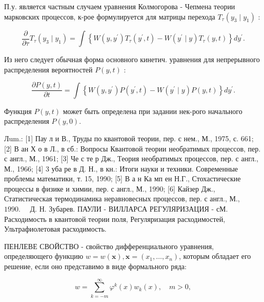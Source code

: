 \documentclass[10pt]{article}
\begin{document}
П.у. является частным случаем уравнения Колмогорова - Чепмена теории марковских процессов, к-рое формулируется для матрицы перехода $T_{\tau}\left(y_{3} \mid y_{1}\right)$ :



\[

\frac{\partial}{\partial \tau} T_{\tau}\left(y_{3} \mid y_{1}\right)=\int\left\{W\left(y, y^{\prime}\right) T_{\tau}\left(y^{\prime}, t\right)-W\left(y^{\prime} \mid y\right) T_{\tau}(y, t)\right\} d y^{\prime} .

\]



Из него следует обычная форма основного кинетич. уравнения для непрерывного распределения вероятностей $P(y, t)$ :



\[

\frac{\partial P(y, t)}{\partial t}=\int\left\{W\left(y, y^{\prime}\right) P\left(y^{\prime}, t\right)-W\left(y^{\prime} \mid y\right) P(y, t)\right\} d y^{\prime} .

\]



Функция $P(y, t)$ может быть определена при задании нек-рого начального распределения $P(y, 0)$.



Лum.: [1] Пау л и В., Труды по квантовой теории, пер. с нем., М., 1975, с. 661; [2] В ан Х о в Л., в сб.: Вопросы Квантовой теории необратимых процессов, пер. с англ., М., 1961; [3] Че с те р Дж., Теория необратимых процессов, пер. с англ., М., 1966; [4] 3 уба ре в Д. Н., в кн.: Итоги науки и техники. Современные проблемы математики, т. 15, 1990; [5] В а н Ка мп ен Н.Г., Стохастические процессы в физике и химии, пер. с англ., М., 1990; [6] Кайзер Дж., Статистическая термодинамика неравновесных процессов, пер. с англ., М., $1990 . \quad$ Д. Н. Зубарев. ПАУЛИ - ВИЛЛАРСА РЕГУЛЯРИЗАЦИЯ - сМ. Расходимость в квантовой теории поля, Регуляризация расходимостей, Ультрафиолетовая расходимость.



ПЕНЛЕВЕ СВОЙСТВО - свойство дифференциального уравнения, определяющего функцию $w=w(\boldsymbol{x}), \boldsymbol{x}=\left(x_{1}, \ldots, x_{n}\right)$, которым обладает его решение, если оно представимо в виде формального ряда:



\[

w=\sum_{k=-m}^{\infty} \varphi^{k}(x) w_{k}(x), \quad m>0,

\]
\end{document}
